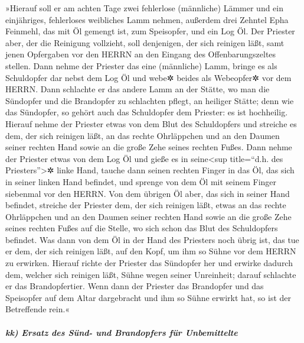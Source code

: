 »Hierauf soll er am achten Tage zwei fehlerlose
(männliche) Lämmer und ein einjähriges, fehlerloses weibliches Lamm
nehmen, außerdem drei Zehntel Epha Feinmehl, das mit Öl gemengt ist, zum
Speisopfer, und ein Log Öl. Der Priester aber, der die
Reinigung vollzieht, soll denjenigen, der sich reinigen läßt, samt jenen
Opfergaben vor den HERRN an den Eingang des Offenbarungszeltes stellen.
Dann nehme der Priester das eine (männliche) Lamm, bringe
es als Schuldopfer dar nebst dem Log Öl und webe✲ beides als Webeopfer✲
vor dem HERRN. Dann schlachte er das andere Lamm an der
Stätte, wo man die Sündopfer und die Brandopfer zu schlachten pflegt, an
heiliger Stätte; denn wie das Sündopfer, so gehört auch das Schuldopfer
dem Priester: es ist hochheilig. Hierauf nehme der
Priester etwas von dem Blut des Schuldopfers und streiche es dem, der
sich reinigen läßt, an das rechte Ohrläppchen und an den Daumen seiner
rechten Hand sowie an die große Zehe seines rechten Fußes.
Dann nehme der Priester etwas von dem Log Öl und gieße es
in seine\textless sup title=``d.h. des Priesters''\textgreater✲ linke
Hand, tauche dann seinen rechten Finger in das Öl, das
sich in seiner linken Hand befindet, und sprenge von dem Öl mit seinem
Finger siebenmal vor den HERRN. Von dem übrigen Öl aber,
das sich in seiner Hand befindet, streiche der Priester dem, der sich
reinigen läßt, etwas an das rechte Ohrläppchen und an den Daumen seiner
rechten Hand sowie an die große Zehe seines rechten Fußes auf die
Stelle, wo sich schon das Blut des Schuldopfers befindet.
Was dann von dem Öl in der Hand des Priesters noch übrig
ist, das tue er dem, der sich reinigen läßt, auf den Kopf, um ihm so
Sühne vor dem HERRN zu erwirken. Hierauf richte der
Priester das Sündopfer her und erwirke dadurch dem, welcher sich
reinigen läßt, Sühne wegen seiner Unreinheit; darauf schlachte er das
Brandopfertier. Wenn dann der Priester das Brandopfer und
das Speisopfer auf dem Altar dargebracht und ihm so Sühne erwirkt hat,
so ist der Betreffende rein.«

\hypertarget{kk-ersatz-des-suxfcnd--und-brandopfers-fuxfcr-unbemittelte}{%
\subparagraph{kk) Ersatz des Sünd- und Brandopfers für
Unbemittelte}\label{kk-ersatz-des-suxfcnd--und-brandopfers-fuxfcr-unbemittelte}}

